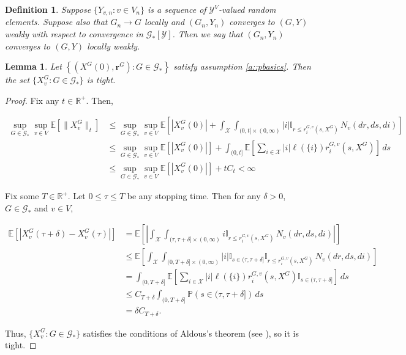 \documentclass[12pt]{article}
\newcommand{\mb}{\mathbb}
\newcommand{\mc}{\mathcal}
\newcommand{\ra}{\rightarrow}
\newcommand{\pr}{\mb{P}}							%
\newcommand{\ex}[1]{\mb{E}\left[#1\right]}			%
\newcommand{\sta}{\mc{X}}							%
\newcommand{\Xf}{X}									%
\newcommand{\poiss}{N}								%
\newcommand{\Sm}{\ell}								%
\newcommand{\rate}{r}								%
\newcommand{\poissv}[1]{_{#1}}						%
\newcommand{\vind}[1]{_{#1}}						%
\newcommand{\tme}[1]{(#1)}							%
\newcommand{\gind}[1]{^{#1}}						%
\newcommand{\stpara}[1]{_{#1}}						%
\newcommand{\tpara}[1]{_{#1}}						%
\newcommand{\gvpara}[2]{^{#1,#2}}					%
\newcommand{\rateset}{\mathbf{\rate}}				%
\newcommand{\jumpbd}[1]{C_{#1}}						%
\newcommand{\tmepro}[2]{(#1,#2)}					%
\newcommand{\Gs}{\mc{G}_\ast}						%
\newcommand{\spce}{\mc{Y}}							%
\renewcommand{\sp}[1]{[#1]}							%
\newcommand{\vindit}[2]{_{#1,#2}}					%
\newcommand{\Xg}{Y}									%
\newcommand{\rt}{\tau}								%
\renewcommand{\it}[1]{_{#1}}						%
\newtheorem{lem}[thms]{Lemma}
\newtheorem{defn}[thms]{Definition}
\begin{document}
\begin{defn}
Suppose \(\{\Xg\vindit{v}{n}:v \in V\it{n}\}\) is a sequence of \(\spce^V\)-valued random elements. Suppose also that \(G\it{n} \ra G\) locally and \((G\it{n},\Xg\it{n})\) converges to \((G,\Xg)\) weakly with respect to convergence in \(\Gs\sp{\spce}\). Then we say that \((G\it{n},\Xg\it{n})\) converges to \((G,\Xg)\) locally weakly.
\label{lwc::lwc}
\end{defn} 

\begin{lem}
Let \(\left\{(\Xf\gind{G}\tme{0},\rateset\gind{G}):G \in \Gs\right\}\) satisfy assumption \ref{a::pbasics}. Then the set \(\{\Xf\gind{G}\vind{v}:G \in \Gs\}\) is tight.
\label{lwc::tight}
\end{lem}
\begin{proof}
Fix any \(t \in \mb{R}^+\). Then,

\begin{align*}
\sup_{G\in \Gs}\sup_{v \in V} \ex{\|\Xf\gind{G}\vind{v}\|\tpara{t}} &\leq \sup_{G\in \Gs}\sup_{v \in V}\ex{|\Xf\gind{G}\vind{v}\tme{0}| + \int_\sta\int_{(0,t]\times(0,\infty)} |i|\mb{I}_{r \leq \rate\gvpara{G}{v}\stpara{i}\tmepro{s}{\Xf\gind{G}}}\,\poiss\poissv{v}(dr,ds,di)}\\
&\leq \sup_{G\in \Gs}\sup_{v \in V}\ex{|\Xf\gind{G}\vind{v}\tme{0}|} + \int_{(0,t]}\ex{\sum_{i\in \sta}|i|\Sm(\{i\})\rate\gvpara{G}{v}\stpara{i}\tmepro{s}{\Xf\gind{G}}}\,ds\\
&\leq \sup_{G\in \Gs}\sup_{v \in V}\ex{|\Xf\gind{G}\vind{v}\tme{0}|} + t\jumpbd{t} < \infty
\end{align*}

Fix some \(T \in \mb{R}^+\). Let \(0 \leq \rt \leq T\) be any stopping time. Then for any \(\delta > 0\), \(G \in \Gs\) and \(v \in V\),

\begin{align*}
\ex{\left|\Xf\gind{G}\vind{v}\tme{\rt + \delta} - \Xf\gind{G}\vind{v}\tme{\rt}\right|} &= \ex{\left|\int_\sta\int_{(\rt,\rt+\delta]\times (0,\infty)} i\mb{I}_{r \leq \rate\gvpara{G}{v}\stpara{i}\tmepro{s}{\Xf\gind{G}}}\,\poiss\poissv{v}(dr,ds,di)\right|}\\
&\leq \ex{\int_\sta\int_{(0,T+\delta]\times (0,\infty)} |i|\mb{I}_{s \in (\rt,\rt+\delta]}\mb{I}_{r \leq \rate\gvpara{G}{v}\stpara{i}\tmepro{s}{\Xf\gind{G}}}\,\poiss\poissv{v}(dr,ds,di)}\\
&= \int_{(0,T + \delta]}\ex{\sum_{i\in \sta} |i|\Sm(\{i\})\rate\gvpara{G}{v}\stpara{i}\tmepro{s}{\Xf\gind{G}}\mb{I}_{s \in (\rt,\rt+\delta]}}\,ds\\
&\leq \jumpbd{T+\delta}\int_{(0,T+\delta]} \pr\left(s \in (\rt,\rt+\delta]\right)\,ds\\
&= \delta\jumpbd{T + \delta}.
\end{align*}

Thus, \(\{\Xf\gind{G}\vind{v}:G \in \Gs\}\) satisfies the conditions of Aldous's theorem (see \cite[Theorem 16.10]{Bil99}), so it is tight.
\end{proof}
\end{document}
